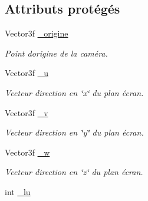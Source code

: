 \subsection*{Attributs protégés}
\begin{DoxyCompactItemize}
\item 
\hypertarget{class_camera_a1a6ee6428d4087c286f2443a1605cb16}{}Vector3f \hyperlink{class_camera_a1a6ee6428d4087c286f2443a1605cb16}{\+\_\+origine}\label{class_camera_a1a6ee6428d4087c286f2443a1605cb16}

\begin{DoxyCompactList}\small\item\em Point d\textquotesingle{}origine de la caméra. \end{DoxyCompactList}\item 
\hypertarget{class_camera_a613c0f2daa3b5a8e3fecfd60967d3d4b}{}Vector3f \hyperlink{class_camera_a613c0f2daa3b5a8e3fecfd60967d3d4b}{\+\_\+u}\label{class_camera_a613c0f2daa3b5a8e3fecfd60967d3d4b}

\begin{DoxyCompactList}\small\item\em Vecteur direction en \char`\"{}x\char`\"{} du plan écran. \end{DoxyCompactList}\item 
\hypertarget{class_camera_a3b572603ea0aedb7c20acd8fd93c0a2a}{}Vector3f \hyperlink{class_camera_a3b572603ea0aedb7c20acd8fd93c0a2a}{\+\_\+v}\label{class_camera_a3b572603ea0aedb7c20acd8fd93c0a2a}

\begin{DoxyCompactList}\small\item\em Vecteur direction en \char`\"{}y\char`\"{} du plan écran. \end{DoxyCompactList}\item 
\hypertarget{class_camera_a2b14e23c7d3b051b45164df1ade06592}{}Vector3f \hyperlink{class_camera_a2b14e23c7d3b051b45164df1ade06592}{\+\_\+w}\label{class_camera_a2b14e23c7d3b051b45164df1ade06592}

\begin{DoxyCompactList}\small\item\em Vecteur direction en \char`\"{}z\char`\"{} du plan écran. \end{DoxyCompactList}\item 
\hypertarget{class_camera_af1074fd7009c6d72ab5ddaed9513b5a4}{}int \hyperlink{class_camera_af1074fd7009c6d72ab5ddaed9513b5a4}{\+\_\+lu}\label{class_camera_af1074fd7009c6d72ab5ddaed9513b5a4}


\end{DoxyCompactItemize}
